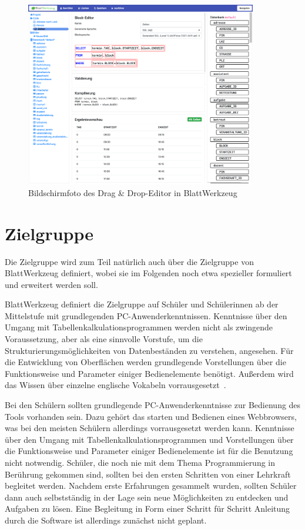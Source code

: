 \begin{figure}
    \centering
    \includegraphics[width=0.9\textwidth]{gfx/requirements-existing-draganddrop.png}
    \caption{Bildschirmfoto des Drag \& Drop-Editor in BlattWerkzeug}
    \label{fig:requirements:existing:draganddrop}
\end{figure}

\section{Zielgruppe}
\label{sec:requirements:target}

Die Zielgruppe wird zum Teil natürlich auch über die Zielgruppe von BlattWerkzeug definiert, wobei sie im Folgenden noch etwa spezieller formuliert und erweitert werden soll.

BlattWerkzeug definiert die Zielgruppe auf Schüler und Schülerinnen ab der Mittelstufe mit grundlegenden PC-Anwenderkenntnissen. Kenntnisse über den Umgang mit Tabellenkalkulationsprogrammen werden nicht als zwingende Voraussetzung, aber als eine sinnvolle Vorstufe, um die Strukturierungsmöglichkeiten von Datenbeständen zu verstehen, angesehen. Für die Entwicklung von Oberflächen werden grundlegende Vorstellungen über die Funktionsweise und Parameter einiger Bedienelemente benötigt. Außerdem wird das Wissen über einzelne englische Vokabeln vorrausgesetzt~\cite[22-23]{riemer2016}.

Bei den Schülern sollten grundlegende PC-Anwenderkenntnisse zur Bedienung des Tools vorhanden sein. Dazu gehört das starten und Bedienen eines Webbrowsers, was bei den meisten Schülern allerdings vorrausgesetzt werden kann. Kenntnisse über den Umgang mit Tabellenkalkulationsprogrammen und Vorstellungen über die Funktionsweise und Parameter einiger Bedienelemente ist für die Benutzung nicht notwendig. Schüler, die noch nie mit dem Thema Programmierung in Berührung gekommen sind, sollten bei den ersten Schritten von einer Lehrkraft begleitet werden. Nachdem erste Erfahrungen gesammelt wurden, sollten Schüler dann auch selbstständig in der Lage sein neue Möglichkeiten zu entdecken und Aufgaben zu lösen. Eine Begleitung in Form einer Schritt für Schritt Anleitung durch die Software ist allerdings zunächst nicht geplant.

